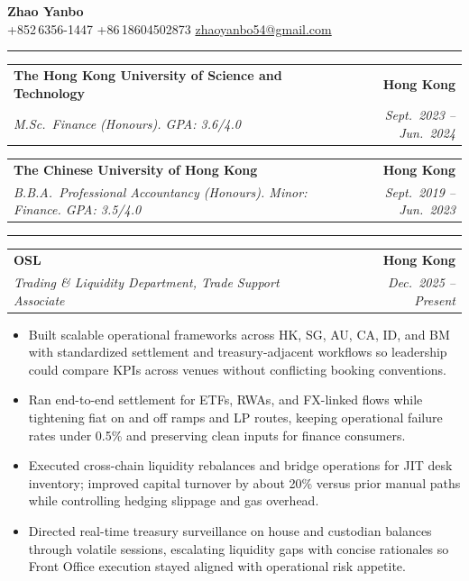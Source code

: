 \documentclass[9pt,a4paper]{extarticle}
\makeatletter
\newcommand{\ressection}[1]{%
  \vspace{0.8em}%
  \noindent{\large\scshape\bfseries #1}\par\nobreak
  \vspace{-\parskip}%
  \vspace{-\parskip}%
  \vspace{-\parskip}%
  \vspace{-\parskip}%
  \noindent\rule{\linewidth}{0.1pt}\par\nobreak
  \vspace{-\parskip}%
}
\newcommand{\resumeSubheading}[4]{%
  \vspace{0.6em}%
  \begin{tabular*}{\textwidth}{l@{\extracolsep{\fill}}r}
    \textbf{#1} & \textbf{#2} \\
    \textit{\small #3} & \textit{\small #4} \\
  \end{tabular*}\vspace{0.32em}}
\makeatother
\begin{document}
\begin{center}
  {\LARGE\bfseries Zhao Yanbo}\\[0.35em]
  \small
  +852\,6356-1447 \;\textbar\;
  +86\,18604502873 \;\textbar\;
  \href{mailto:zhaoyanbo54@gmail.com}{zhaoyanbo54@gmail.com}
\end{center}
\vspace{-0.2em}

\ressection{Education}

\resumeSubheading{The Hong Kong University of Science and Technology}{Hong Kong}{M.Sc.\ Finance (Honours). GPA: 3.6/4.0}{Sept.\ 2023 -- Jun.\ 2024}

\resumeSubheading{The Chinese University of Hong Kong}{Hong Kong}{B.B.A.\ Professional Accountancy (Honours). Minor: Finance. GPA: 3.5/4.0}{Sept.\ 2019 -- Jun.\ 2023}

\ressection{Work Experience}

\resumeSubheading{OSL}{Hong Kong}{Trading \& Liquidity Department, Trade Support Associate}{Dec.\ 2025 -- Present}
\begin{itemize}
  \item Built scalable operational frameworks across HK, SG, AU, CA, ID, and BM with standardized settlement and treasury-adjacent workflows so leadership could compare KPIs across venues without conflicting booking conventions.
  \item Ran end-to-end settlement for ETFs, RWAs, and FX-linked flows while tightening fiat on and off ramps and LP routes, keeping operational failure rates under 0.5\% and preserving clean inputs for finance consumers.
  \item Executed cross-chain liquidity rebalances and bridge operations for JIT desk inventory; improved capital turnover by about 20\% versus prior manual paths while controlling hedging slippage and gas overhead.
  \item Directed real-time treasury surveillance on house and custodian balances through volatile sessions, escalating liquidity gaps with concise rationales so Front Office execution stayed aligned with operational risk appetite.
\end{itemize}
\end{document}
